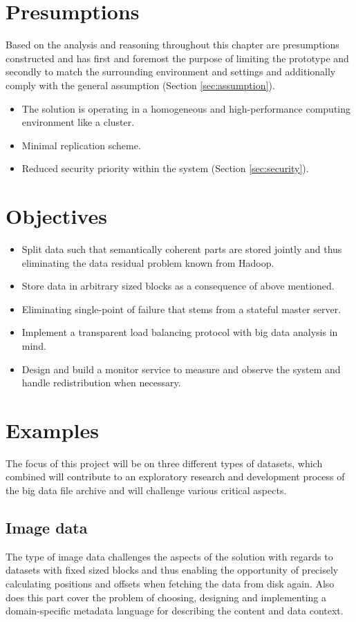 \section{Presumptions} \label{sec:presumptions}
Based on the analysis and reasoning throughout this chapter are presumptions constructed and has first and foremost the purpose of limiting the prototype and secondly to match the surrounding environment and settings and additionally comply with the general assumption (Section \ref{sec:assumption}).

\begin{itemize}
	\item The solution is operating in a homogeneous and high-performance computing environment like a cluster.
	\item Minimal replication scheme.
	\item Reduced security priority within the system (Section \ref{sec:security}).
\end{itemize}

\section{Objectives} \label{sec:objectives}
\begin{itemize}
	\item Split data such that semantically coherent parts are stored jointly and thus eliminating the data residual problem known from Hadoop.
	\item Store data in arbitrary sized blocks as a consequence of above mentioned.
	\item Eliminating single-point of failure that stems from a stateful master server.
	\item Implement a transparent load balancing protocol with big data analysis in mind.
	\item Design and build a monitor service to measure and observe the system and handle redistribution when necessary.
\end{itemize}

\section{Examples} \label{sec:examples}
The focus of this project will be on three different types of datasets, which combined will contribute to an exploratory research and development process of the big data file archive and will challenge various critical aspects. 

\subsection*{Image data}
The type of image data challenges the aspects of the solution with regards to datasets with fixed sized blocks and thus enabling the opportunity of precisely calculating positions and offsets when fetching the data from disk again. Also does this part cover the problem of choosing, designing and implementing a domain-specific metadata language for describing the content and data context. 

